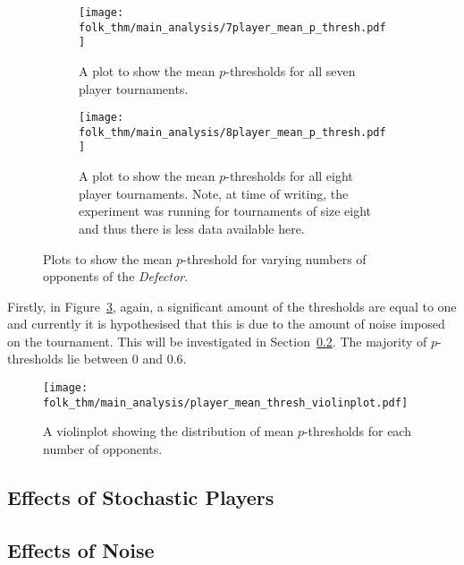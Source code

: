 \begin{figure}
    \newline


    \begin{subfigure}{.45\textwidth}
        \centering
        \texttt{[image: folk\_thm/main\_analysis/7player\_mean\_p\_thresh.pdf]}
        \caption{A plot to show the mean \(p\)-thresholds for all seven player tournaments.}\label{subfig:7player_mean_p_thresh}
    \end{subfigure}
    \begin{subfigure}{.45\textwidth}
        \centering
        \texttt{[image: folk\_thm/main\_analysis/8player\_mean\_p\_thresh.pdf]}
        \caption{A plot to show the mean \(p\)-thresholds for all eight player tournaments. Note, at time of writing, the experiment was running for tournaments of size eight and thus there is less data available here.}\label{subfig:8player_mean_p_thresh}
    \end{subfigure}
    \caption{Plots to show the mean \(p\)-threshold for varying numbers of opponents of the \textit{Defector}.}\label{fig:player_mean_p_thresh}
\end{figure}


Firstly, in Figure~\ref{fig:player_mean_p_thresh}, again, a significant amount
of the thresholds are equal to one and currently it is hypothesised that this is
due to the amount of noise imposed on the tournament. This will be investigated
in Section~\ref{subsec:Effects_of_Noise}. The majority of \(p\)-thresholds lie
between 0 and 0.6. 



\begin{figure}
    \centering
    \texttt{[image: folk\_thm/main\_analysis/player\_mean\_thresh\_violinplot.pdf]}
    \caption{A violinplot showing the distribution of mean \(p\)-thresholds for each number of opponents.}\label{fig:player_mean_thresh_violinplot}
\end{figure}


\subsection{Effects of Stochastic Players}\label{subsec:Effects_of_Stochastic_Players}






\subsection{Effects of Noise}\label{subsec:Effects_of_Noise}


